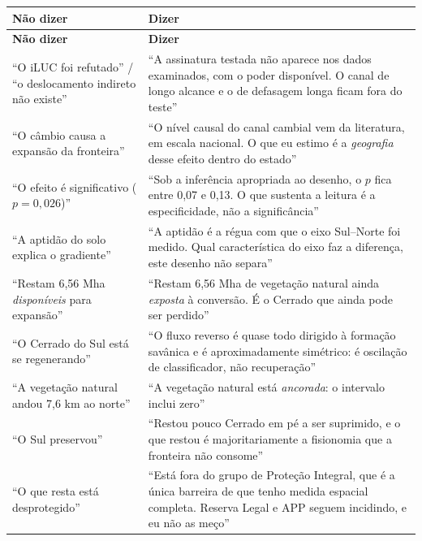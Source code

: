 \vspace{8pt}
\begin{longtable}{@{}p{6.5cm}p{8.2cm}@{}}
\toprule
\textbf{Não dizer} & \textbf{Dizer} \\
\midrule
\endfirsthead
\toprule
\textbf{Não dizer} & \textbf{Dizer} \\
\midrule
\endhead
``O iLUC foi refutado'' / ``o deslocamento indireto não existe'' &
``A assinatura testada não aparece nos dados examinados, com o poder disponível.
O canal de longo alcance e o de defasagem longa ficam fora do teste'' \\
\addlinespace
``O câmbio causa a expansão da fronteira'' &
``O nível causal do canal cambial vem da literatura, em escala nacional. O que
eu estimo é a \emph{geografia} desse efeito dentro do estado'' \\
\addlinespace
``O efeito é significativo ($p = 0{,}026$)'' &
``Sob a inferência apropriada ao desenho, o $p$ fica entre 0,07 e 0,13. O que
sustenta a leitura é a especificidade, não a significância'' \\
\addlinespace
``A aptidão do solo explica o gradiente'' &
``A aptidão é a régua com que o eixo Sul--Norte foi medido. Qual característica
do eixo faz a diferença, este desenho não separa'' \\
\addlinespace
``Restam 6,56 Mha \emph{disponíveis} para expansão'' &
``Restam 6,56 Mha de vegetação natural ainda \emph{exposta} à conversão. É o
Cerrado que ainda pode ser perdido'' \\
\addlinespace
``O Cerrado do Sul está se regenerando'' &
``O fluxo reverso é quase todo dirigido à formação savânica e é aproximadamente
simétrico: é oscilação de classificador, não recuperação'' \\
\addlinespace
``A vegetação natural andou 7,6 km ao norte'' &
``A vegetação natural está \emph{ancorada}: o intervalo inclui zero'' \\
\addlinespace
``O Sul preservou'' &
``Restou pouco Cerrado em pé a ser suprimido, e o que restou é majoritariamente
a fisionomia que a fronteira não consome'' \\
\addlinespace
``O que resta está desprotegido'' &
``Está fora do grupo de Proteção Integral, que é a única barreira de que tenho
medida espacial completa. Reserva Legal e APP seguem incidindo, e eu não as
meço'' \\

\end{longtable}
